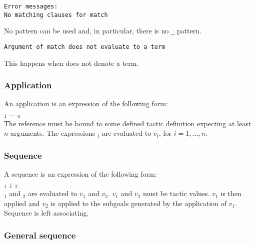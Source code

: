 {\tt Error messages:}\\

{\tt No matching clauses for match}

No pattern can be used and, in particular, there is no {\tt \_} pattern.

{\tt Argument of match does not evaluate to a term}

This happens when {\tacexpr} does not denote a term.

\subsubsection{Application}

An application is an expression of the following form:\\

{\qualid} {\tacarg}$_1$ ... {\tacarg}$_n$\\

The reference {\qualid} must be bound to some defined tactic
definition expecting at least $n$ arguments.  The expressions
{\tacexpr}$_i$ are evaluated to $v_i$, for $i=1,...,n$.


\subsubsection{Sequence}

A sequence is an expression of the following form:\\

{\tacexpr}$_1$ {\tt ;} {\tacexpr}$_2$\\

{\tacexpr}$_1$ and {\tacexpr}$_2$ are evaluated to $v_1$ and
$v_2$. $v_1$ and $v_2$ must be tactic values. $v_1$ is then applied
and $v_2$ is applied to the subgoals generated by the application of
$v_1$. Sequence is left associating.

\subsubsection{General sequence}

